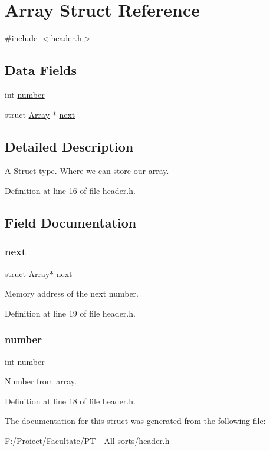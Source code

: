 \hypertarget{struct_array}{}\section{Array Struct Reference}
\label{struct_array}


{\ttfamily \#include $<$header.\+h$>$}

\subsection*{Data Fields}
\begin{DoxyCompactItemize}
\item 
int \hyperlink{struct_array_a7106e2abc437ad981830d14176d15f09}{number}
\item 
struct \hyperlink{struct_array}{Array} $\ast$ \hyperlink{struct_array_ac930bd01ffb8898512512ca300f39305}{next}
\end{DoxyCompactItemize}


\subsection{Detailed Description}
A Struct type. Where we can store our array. 

Definition at line 16 of file header.\+h.



\subsection{Field Documentation}
\mbox{\label{struct_array_ac930bd01ffb8898512512ca300f39305}} 
\subsubsection{\texorpdfstring{next}{next}}
{\footnotesize\ttfamily struct \hyperlink{struct_array}{Array}$\ast$ next}

Memory address of the next number. 

Definition at line 19 of file header.\+h.

\mbox{\label{struct_array_a7106e2abc437ad981830d14176d15f09}} 
\subsubsection{\texorpdfstring{number}{number}}
{\footnotesize\ttfamily int number}

Number from array. 

Definition at line 18 of file header.\+h.



The documentation for this struct was generated from the following file\+:\begin{DoxyCompactItemize}
\item 
F\+:/\+Proiect/\+Facultate/\+P\+T -\/ All sorts/\hyperlink{header_8h}{header.\+h}\end{DoxyCompactItemize}
